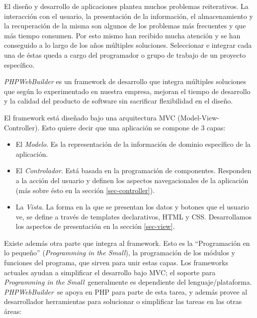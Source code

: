 \documentclass[a4paper,10pt]{article}
\newcommand{\PITS}{\emph{Programming in the Small}} %
\newcommand{\PWB}{\emph{PHPWebBuilder}}
\begin{document}
El diseño y desarrollo de aplicaciones plantea muchos problemas reiterativos. La interacción con el usuario, la presentación de la información, el almacenamiento y la recuperación de la misma son algunos de los problemas más frecuentes y que más tiempo consumen.
Por esto mismo han recibido mucha atención y se han conseguido a lo largo de los años múltiples soluciones. Seleccionar e integrar cada una de éstas queda a cargo del programador o grupo de trabajo de un proyecto específico.

\PWB \cite{PWB} es un framework de desarrollo que integra múltiples soluciones que según lo experimentado en nuestra empresa, mejoran el tiempo de desarrollo y la calidad del producto de software sin sacrificar flexibilidad en el diseño.

El framework está diseñado bajo una arquitectura MVC (Model-View-Controller)\cite{mvc}.
Esto quiere decir que una aplicación se compone de 3 capas:
\begin{itemize}
\item El \emph{Modelo}. Es la representación de la información de dominio específico de la aplicación.
\item El \emph{Controlador}. Está basada en la programación de componentes. Responden a la acción del usuario y definen los aspectos navegacionales de la aplicación (más sobre ésto en la sección \ref{sec-controller}).
\item La \emph{Vista}. La forma en la que se presentan los datos y botones que el usuario ve, se define a través de templates declarativos, HTML y CSS. Desarrollamos los aspectos de presentación en la sección \ref{sec-view}.
\end{itemize}

Existe además otra parte que integra al framework. Esto es la ``Programación en lo pequeño'' (\PITS), la programación de los módulos y funciones del programa, que sirven para unir estas capas. Los frameworks actuales ayudan a simplificar el desarrollo bajo MVC; el soporte para \PITS \ generalmente es dependiente del lenguaje/plataforma. \PWB \ se apoya en PHP para parte de esta tarea, y además provee al desarrollador herramientas para solucionar o simplificar las tareas en las otras áreas:
\end{document}
